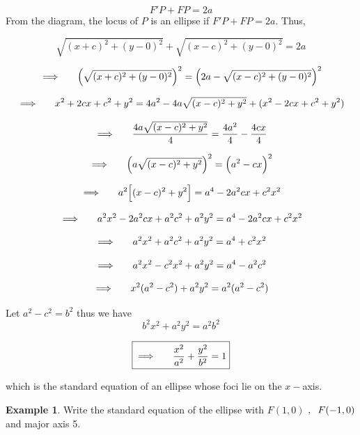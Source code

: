 \documentclass[11pt,a4paper]{article}
\theoremstyle{definition}
\newtheorem{exa}[thm]{Example}
\begin{document}
$$F'P + FP = 2a$$
From the diagram, the locus of $P$ is an ellipse if \hspace{0.2cm}$F'P + FP = 2a$. Thus,

$$ \sqrt{(x + c)^2 + ( y -0)^2} + \sqrt{(x-c)^2 + (y-0)^2} = 2a$$

$$\implies\hspace{0.5cm} \Big(\sqrt{(x + c)^2 + (y - 0)^2}\Big)^2 = \Big(2a - \sqrt{(x - c)^2 + (y - 0)^2}\Big)^2$$

$$\implies\hspace{0.5cm} x^2 +2cx + c^2 + y^2 = 4a^2 - 4a\sqrt{(x- c)^2 + y^2} + (x^2 -2cx + c^2 +y^2)$$

$$\implies\hspace{0.5cm} \frac{4a\sqrt{(x - c)^2 + y^2}}{4} = \frac{4a^2}{4} - \frac{4cx}{4}$$

$$\implies\hspace{0.5cm} \Big(a\sqrt{(x - c)^2 + y^2}\Big)^2 = \Big(a^2 - cx\Big)^2$$

$$\implies\hspace{0.5cm} a^2\Big[(x-c)^2 + y^2\Big] = a^4 -2a^2cx + c^2x^2$$

$$\implies\hspace{0.5cm} a^2x^2 - 2a^2cx + a^2c^2 + a^2y^2 = a^4 -2a^2cx + c^2x^2$$

$$\implies\hspace{0.5cm} a^2x^2 + a^2c^2 + a^2y^2 = a^4 + c^2x^2$$

$$\implies\hspace{0.5cm} a^2x^2 - c^2x^2 + a^2y^2 = a^4 - a^2c^2$$

$$\implies\hspace{0.5cm} x^2(a^2 -c^2) + a^2 y^2 = a^2 (a^2 - c^2)$$


Let $a^2 - c^2 = b^2$ thus we have $$b^2x^2 + a^2y^2 = a^2b^2$$

$$\boxed{\implies\hspace{0.5cm} \dfrac{x^2}{a^2} + \dfrac{y^2}{b^2} = 1}$$

which is the standard equation of an ellipse whose foci lie on the $x-$axis.


\begin{exa}


Write the standard equation of the ellipse with $F(1,0)$ $, \hspace{0.2cm} F(-1,0)$ and major axis 5.
\end{exa}
\end{document}
